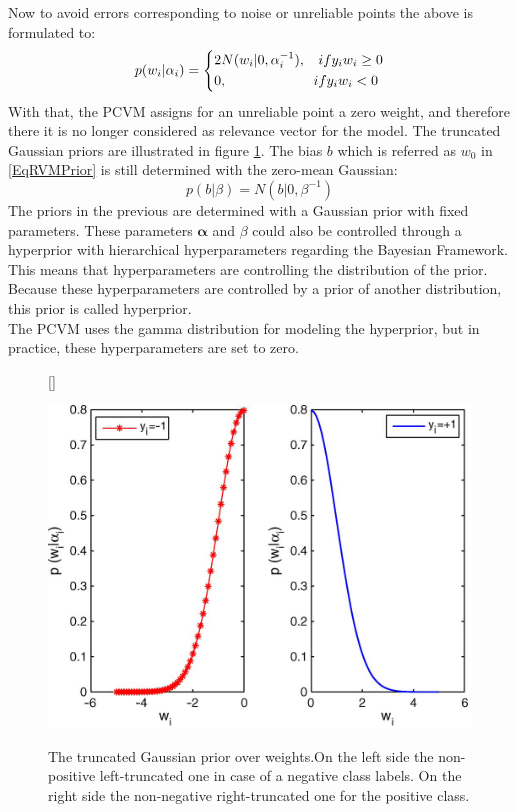 Now to avoid errors corresponding to noise or unreliable points the above is formulated to:\cite{Chen.2009}
\begin{equation}\label{EqPcvmWSel}
p(w_i \vert \alpha_i) =
\begin{dcases*}
2N(w_i \vert 0,\alpha_i^{-1} ),\>\>\>\>  if y_i w_i \ge 0\\
0				,\>\>\>\>\>\>\>\>\>\>\>\>\>\>\>\>\>\>\>\>\>\>\>\>\>\>\>\> if y_i w_i<0
\end{dcases*}
\end{equation}
With that, the \acs{PCVM} assigns for an unreliable point a zero weight, and therefore there it is no longer considered as relevance vector for the model.
The truncated Gaussian priors are illustrated in figure \ref{FigTruncGaus}.\newline
The bias $b$ which is referred as $w_0$ in \eqref{EqRVMPrior} is still determined with the zero-mean Gaussian:\cite{Chen.2009}
\begin{equation}\label{EqPcvmBPrior}
p(b \vert \beta) = N(b \vert 0, \beta^{-1})
\end{equation}
The priors in the previous are determined with a Gaussian prior with fixed parameters.
These parameters $\boldsymbol{\alpha }$ and $\beta$ could also be controlled through a hyperprior with hierarchical hyperparameters regarding the Bayesian Framework.
This means that hyperparameters are controlling the distribution of the prior. \cite[p. 71]{Bishop.2009}
Because these hyperparameters are controlled by a prior of another distribution, this prior is called hyperprior.\cite[.p 423]{Bishop.1995}\\
The \acs{PCVM} uses the gamma distribution for modeling the hyperprior, but in practice, these hyperparameters are set to zero.\cite{Chen.2009}
\begin{figure}
	\centering
	[\FBwidth]
	{\caption[Truncated Gaussian Priors over Weights]{The truncated Gaussian prior over weights.On the left side the non-positive left-truncated one in case of a negative class labels. On the right side the non-negative right-truncated one for the positive class.\cite{Chen.2009}}}
	{\includegraphics[width=\linewidth]{figures/TuncatedGaussian.png}\label{FigTruncGaus}}
\end{figure}
